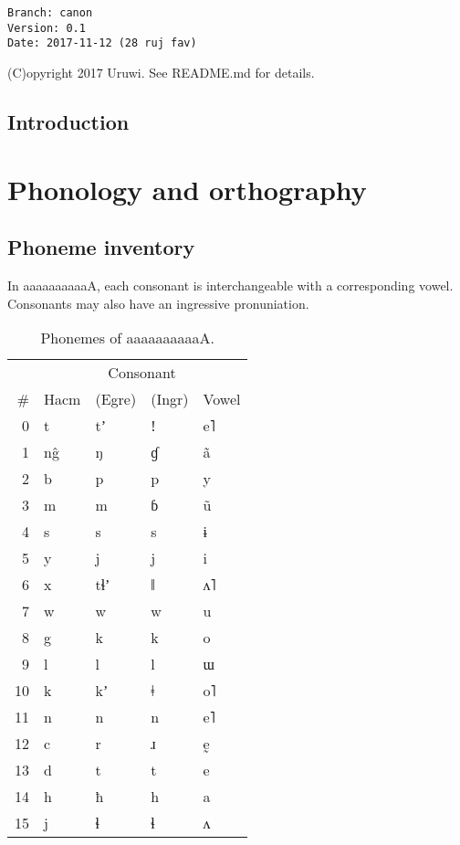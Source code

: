 \documentclass{book}
\newcommand{\lname}{aaaaaaaaaaA}
\begin{document}
\begin{verbatim}
Branch: canon
Version: 0.1
Date: 2017-11-12 (28 ruj fav)
\end{verbatim}

(C)opyright 2017 Uruwi. See README.md for details.

\tableofcontents

\section{Introduction}

\chapter{Phonology and orthography}

\section{Phoneme inventory}


In \lname{}, each consonant is interchangeable with a corresponding vowel. Consonants may also have an ingressive pronuniation.

\begin{table}[h]
  \caption{Phonemes of \lname.}
  \centering
  \begin{tabular}{r>{\kardinal}llll}
    & & \multicolumn{2}{c}{Consonant} & \\
    \# & \textnormal{Hacm} & (Egre) & (Ingr) & Vowel \\
    \hline
    0 & t & tʼ & ǃ & e˥ \\
    1 & n\^g & ŋ & ɠ & ã \\
    2 & b & p & p & y \\
    3 & m & m & ɓ & ũ \\
    4 & s & s & s & ɨ \\
    5 & y & j & j & i \\
    6 & x & tɬʼ & ǁ & ʌ˥ \\
    7 & w & w & w & u \\
    8 & g & k & k & o \\
    9 & l & l & l & ɯ \\
    10 & k & kʼ & ǂ & o˥ \\
    11 & n & n & n & e˥ \\
    12 & c & r & ɹ & ḛ \\
    13 & d & t & t & e \\
    14 & h & ħ & h & a \\
    15 & j & ɬ & ɬ & ʌ \\
   \end{tabular}
\end{table}
\end{document}
